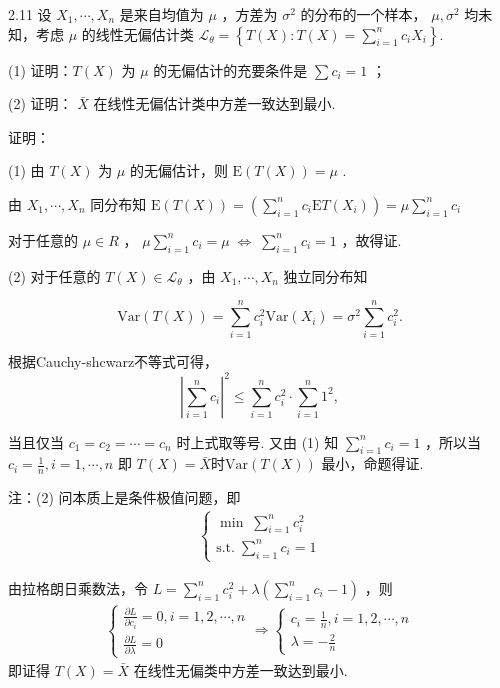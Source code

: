\begin{example}
    2.11 设 $X_{1}, \cdots, X_{n}$ 是来自均值为 $\mu$ ，方差为 $\sigma^{2}$ 的分布的一个样本， $\mu, \sigma^{2}$ 均未知，考虑 $\mu$ 的线性无偏估计类
    $\mathscr{L}_{\theta}=\left\{T(X): T(X)=\sum_{i=1}^{n} c_{i} X_{i}\right\}.$

    (1) 证明：$T(X)$ 为 $\mu$ 的无偏估计的充要条件是 $\sum c_{i}=1$ ；
    
    (2) 证明： $\bar{X}$ 在线性无偏估计类中方差一致达到最小.

    证明：

    (1) 由 $T(X)$ 为 $\mu$ 的无偏估计，则 $\text{E}(T(X))=\mu$ .

    由 $X_{1}, \cdots, X_{n}$ 同分布知 $\text{E}(T(X))=\left(\sum_{i=1}^{n} c_{i}\text{E}T(X_i)\right) =\mu\sum_{i=1}^{n} c_{i}$

    对于任意的 $\mu \in R$ ， $\mu \sum_{i=1}^{n} c_{i} =\mu \; \Leftrightarrow \; \sum_{i=1}^{n} c_{i}=1$ ，故得证.

    (2) 对于任意的 $T(X) \in \mathscr{L}_{\theta}$ ，由 $X_{1}, \cdots, X_{n}$ 独立同分布知

    \[
        \text{Var}(T(X))=\sum_{i=1}^{n} c_{i}^{2} \text{Var}\left(X_{i}\right)=\sigma^{2}\sum_{i=1}^{n} c_{i}^{2}.  
    \]

    根据Cauchy-shcwarz不等式可得， 
    \[
        \left|\sum_{i=1}^{n} c_{i}\right|^{2} \leqslant \sum_{i=1}^{n} c_{i}^{2} \cdot \sum_{i=1}^{n} 1^{2},  
    \]

    当且仅当 $c_{1}=c_{2}=\cdots=c_{n}$ 时上式取等号. 又由 (1) 知 $\sum_{i=1}^{n} c_{i}=1$ ，所以当 $c_{i}=\frac{1}{n}, i=1, \cdots, n$ 即 $T(X)=\bar{X} 时 \text{Var}(T(X))$ 最小，命题得证.

    注：(2) 问本质上是条件极值问题，即 
    \[
        \begin{aligned} \left\{\begin{array}{l} \min \; \sum \limits _{i=1}^{n} c_{i}^{2} \\ \text{s.t.} \; \sum \limits_{i=1}^{n} c_{i}=1 \end{array}\right. \end{aligned}  
    \]

    由拉格朗日乘数法，令 $L=\sum_{i=1}^{n} c_{i}^{2}+\lambda\left(\sum_{i=1}^{n} c_{i}-1\right)$ ，则
    \[
        \begin{aligned} \left\{\begin{array}{l} \frac{\partial L}{\partial c_{i}}=0, i=1,2, \cdots, n \\ \frac{\partial L}{\partial \lambda}=0 \end{array} \Rightarrow\left\{\begin{array}{l} c_{i}=\frac{1}{n}, i=1,2, \cdots, n \\ \lambda=-\frac{2}{n} \end{array}\right.\right. \end{aligned}    
    \]
    即证得 $T(X)=\bar{X}$ 在线性无偏类中方差一致达到最小.
\end{example}
